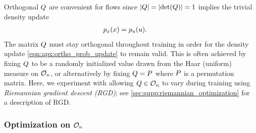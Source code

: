 Orthogonal $Q$ are convenient for flows since $\AbsDet{\vv{Q}} = \left| \Det{\vv{Q}} \right| = 1$ implies the trivial density update
\begin{align}\label{eqn:apx:ortho_prob_update}
    p_{x}(x) & = p_{u}(u).
\end{align}
The matrix $Q$ must stay orthogonal throughout training in order for the density update \eqref{eqn:apx:ortho_prob_update} to remain valid.
This is often achieved by fixing $Q$ to be a randomly initialized value drawn from the Haar (uniform) measure on $\mathcal{O}_{n}$, or alternatively by fixing $Q = P$ where $P$ is a permutation matrix.
Here, we experiment with allowing $Q \in \mathcal{O}_{n}$ to vary during training using \textit{Riemannian gradient descent (\gls*{RGD})};
see \cref{sec:supp:riemannian_optimization} for a description of \gls*{RGD}.

\subsubsection{Optimization on \texorpdfstring{$\mathcal{O}_{n}$}{OrthoN}}

